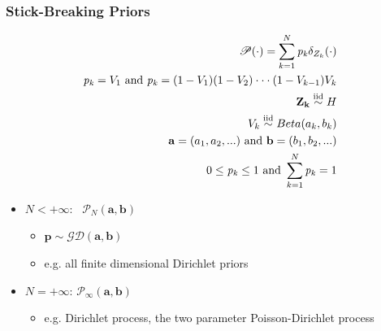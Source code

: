 	

\begin{frame} %
	\frametitle{Stick-Breaking Priors}
	\vspace{-15pt}
	\begin{align*}
		\mathscr{P}(\cdot)= \sum\limits_{k=1}^N
		\mathit{p_{k}}\delta_{Z_{k}}(\cdot) \\
		\mathit{p_{k}}=V_{1} \ \text{and} \  \mathit{p_{k}}=(1-V_{1})(1-V_{2}) \cdot \cdot \cdot(1-V_{k-1})V_{k} \\
		\mathbf{Z_{k}}  \iidsim H \\
		V_{k}  \iidsim Beta(a_{k},b_{k}) \\
		\mathbf{a}=(a_{1},a_{2},...) \ \text{and} \  \mathbf{b}=(b_{1},b_{2},...) \\
		0\leq\mathit{p_{k}}\leq1 \ \text{and} \ \sum\limits_{k=1}^N\mathit{p_{k}}=1 
	\end{align*}
	\vspace{-15pt}
	
	    	\begin{itemize}
	    	    \item $N<+\infty$: \ $\mathscr{P}_{N}(\textbf{a},\textbf{b})$
	    	    \begin{itemize}
	    	        \item $\mathbf{p} \sim \mathscr{GD}(\textbf{a},\textbf{b})$
	    	        \item e.g. all finite dimensional Dirichlet priors
	    	    \end{itemize}
	    	    \item $N=+\infty$: $\mathscr{P}_{\infty}(\textbf{a},\textbf{b})$
	    	    \begin{itemize}
	    	        \item e.g. Dirichlet process, the two parameter Poisson-Dirichlet process
	    	    \end{itemize}
	    	\end{itemize}
\end{frame}


